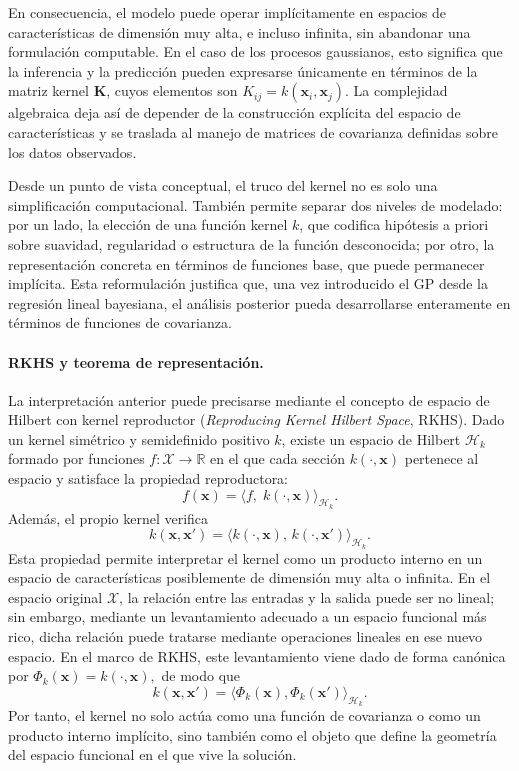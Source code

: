 En consecuencia, el modelo puede operar implícitamente en espacios de características de
dimensión muy alta, e incluso infinita, sin abandonar una formulación computable. En el
caso de los procesos gaussianos, esto significa que la inferencia y la predicción pueden
expresarse únicamente en términos de la matriz kernel \(\bm{K}\), cuyos elementos son
\(
K_{ij}=k(\bm{x}_i,\bm{x}_j).
\)
La complejidad algebraica deja así de depender de la construcción explícita del espacio de
características y se traslada al manejo de matrices de covarianza definidas sobre los datos
observados.

Desde un punto de vista conceptual, el truco del kernel no es solo una simplificación
computacional. También permite separar dos niveles de modelado: por un lado, la elección
de una función kernel \(k\), que codifica hipótesis a priori sobre suavidad, regularidad o
estructura de la función desconocida; por otro, la representación concreta en términos de
funciones base, que puede permanecer implícita. Esta reformulación justifica que, una vez introducido el GP desde la regresión lineal
bayesiana, el análisis posterior pueda desarrollarse enteramente en términos de funciones de
covarianza.

\paragraph{RKHS y teorema de representación.}
La interpretación anterior puede precisarse mediante el concepto de espacio de Hilbert con
kernel reproductor (\emph{Reproducing Kernel Hilbert Space}, RKHS). Dado un kernel
simétrico y semidefinido positivo \(k\), existe un espacio de Hilbert \(\mathcal{H}_k\) formado
por funciones \(f:\mathcal{X}\to\mathbb{R}\) en el que cada sección \(k(\cdot,\bm{x})\) pertenece al
espacio y satisface la propiedad reproductora:
\[
f(\bm{x})=\langle f,\;k(\cdot,\bm{x})\rangle_{\mathcal{H}_k}.
\]
Además, el propio kernel verifica
\[
k(\bm{x},\bm{x}')=
\langle k(\cdot,\bm{x}),\,k(\cdot,\bm{x}')\rangle_{\mathcal{H}_k}.
\]
Esta propiedad permite interpretar el kernel como un producto interno en un espacio de
características posiblemente de dimensión muy alta o infinita. En el espacio original
\(\mathcal{X}\), la relación entre las entradas y la salida puede ser no lineal; sin embargo,
mediante un levantamiento adecuado a un espacio funcional más rico, dicha relación puede
tratarse mediante operaciones lineales en ese nuevo espacio. En el marco de RKHS, este
levantamiento viene dado de forma canónica por
\(
\Phi_k(\bm{x})=k(\cdot,\bm{x}),
\)
de modo que
\[
k(\bm{x},\bm{x}')=
\langle \Phi_k(\bm{x}),\Phi_k(\bm{x}')\rangle_{\mathcal{H}_k}.
\]
Por tanto, el kernel no solo actúa como una función de covarianza o como un producto
interno implícito, sino también como el objeto que define la geometría del espacio funcional
en el que vive la solución.


